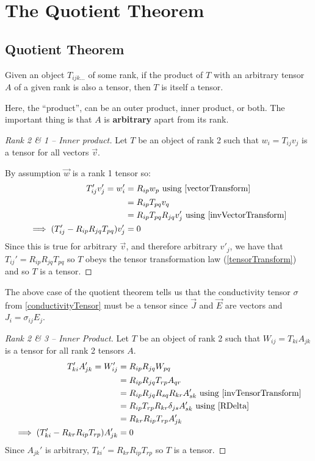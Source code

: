 \documentclass[../main.tex]{subfiles}
\begin{document}
\section{The Quotient Theorem}
\subsection{Quotient Theorem}
\label{quotientTheorem}
\begin{theorem}
  Given an object $T_{ijk\ldots}$ of some rank, if the product of $T$ with an arbitrary tensor $A$ of a given rank is also a tensor, then $T$ is itself a tensor.

  Here, the ``product'', can be an outer product, inner product, or both.
  The important thing is that $A$ is \textbf{arbitrary} apart from its rank.
\end{theorem}
\begin{proof}[Rank 2 \& 1 -- Inner product]
  Let $T$ be an object of rank 2 such that $w_i = T_{i j}v_j$ is a tensor for all vectors $\vec{v}$.

  By assumption $\vec{w}$ is a rank 1 tensor so:
  \begin{align*}
    T_{i j}'v_j' = w_i' &= R_{i p}w_p \text{ using \cref{vectorTransform}} \\
                        &= R_{i p}T_{p q}v_q \\
                        &= R_{i p}T_{p q}R_{j q}v'_j \text{ using \cref{invVectorTransform}} \\
    \implies (T_{i j}' - R_{i p}R_{j q}T_{p q})v'_j &= 0
  \end{align*}
  Since this is true for arbitrary $\vec{v}$, and therefore arbitrary $v'_j$, we have that $T_{i j}' = R_{i p}R_{j q}T_{p q}$ so $T$ obeys the tensor transformation law (\cref{tensorTransform}) and so $T$ is a tensor.
\end{proof}
\begin{remark}
  The above case of the quotient theorem tells us that the conductivity tensor $\sigma$ from \cref{conductivityTensor} must be a tensor since $\vec{J}$ and $\vec{E}$ are vectors and $J_i = \sigma_{i j}E_j$.
\end{remark}
\begin{proof}[Rank 2 \& 3 -- Inner Product]
  Let $T$ be an object of rank 2 such that $W_{i j} = T_{k i}A_{j k}$ is a tensor for all rank 2 tensors $A$.
  \begin{align*}
    T_{k i}' A_{j k}' = W_{i j}' &= R_{i p}R_{j q}W_{p q} \\
                                 &= R_{i p}R_{j q}T_{r p}A_{q r} \\
                                 &= R_{i p}R_{j q}R_{s q}R_{k r}A_{s k}' \text{ using \cref{invTensorTransform}} \\
                                 &= R_{i p}T_{r p}R_{k r}\delta_{j s}A_{s k}' \text{ using \cref{RDelta}} \\
                                 &= R_{k r}R_{i p}T_{r p}A_{j k}' \\
    \implies (T_{k i}' - R_{k r}R_{i p}T_{r p})A_{j k}' &= 0
  \end{align*}
  Since $A_{j k}'$ is arbitrary, $T_{k i}' = R_{k r}R_{i p}T_{r p}$ so $T$ is a tensor.
\end{proof}
\end{document}
